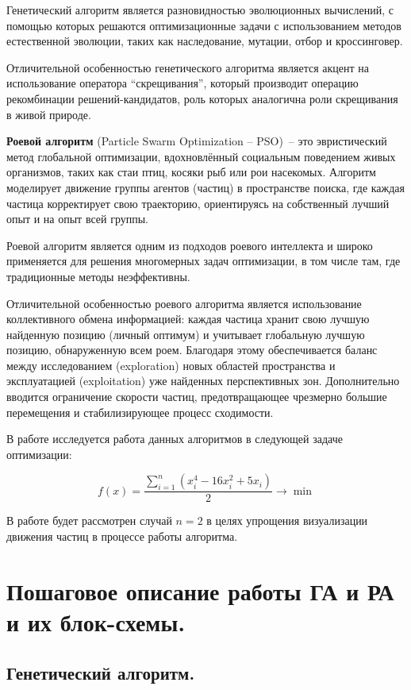 \documentclass[12pt,a4paper]{article}
\begin{document}
Генетический алгоритм является разновидностью эволюционных вычислений, с помощью которых решаются оптимизационные задачи с использованием методов естественной эволюции, таких как наследование, мутации, отбор и кроссинговер.

Отличительной особенностью генетического алгоритма является акцент на использование оператора ``скрещивания'', который производит операцию рекомбинации решений-кандидатов, роль которых аналогична роли скрещивания в живой природе.

\textbf{Роевой алгоритм} (Particle Swarm Optimization -- PSO) -- это эвристический метод глобальной оптимизации, вдохновлённый социальным поведением живых организмов, таких как стаи птиц, косяки рыб или рои насекомых. Алгоритм моделирует движение группы агентов (частиц) в пространстве поиска, где каждая частица корректирует свою траекторию, ориентируясь на собственный лучший опыт и на опыт всей группы.

Роевой алгоритм является одним из подходов роевого интеллекта и широко применяется для решения многомерных задач оптимизации, в том числе там, где традиционные методы неэффективны.

Отличительной особенностью роевого алгоритма является использование коллективного обмена информацией: каждая частица хранит свою лучшую найденную позицию (личный оптимум) и учитывает глобальную лучшую позицию, обнаруженную всем роем. Благодаря этому обеспечивается баланс между исследованием (exploration) новых областей пространства и эксплуатацией (exploitation) уже найденных перспективных зон. Дополнительно вводится ограничение скорости частиц, предотвращающее чрезмерно большие перемещения и стабилизирующее процесс сходимости.

В работе исследуется работа данных алгоритмов в следующей задаче оптимизации:

\begin{equation}
f(x) = \frac{\sum_{i=1}^{n} \left( x_i^{4} - 16x_i^{2} + 5x_i \right)}{2} \rightarrow \min
\end{equation}

В работе будет рассмотрен случай \(n = 2\) в целях упрощения визуализации движения частиц в процессе работы алгоритма.

\section{Пошаговое описание работы ГА и РА и их блок-схемы.}

\subsection{Генетический алгоритм.}
\end{document}
